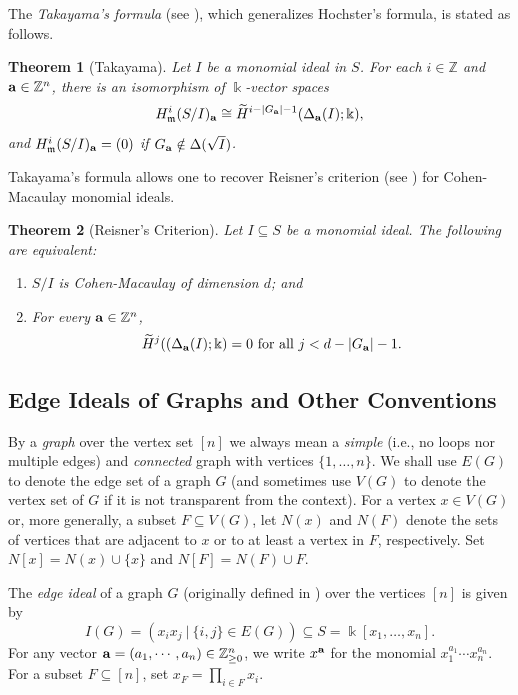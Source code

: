 \documentclass[12pt]{amsart}
\numberwithin{equation}{section}
\newtheorem{theorem}{Theorem}[section]
\theoremstyle{definition}
\theoremstyle{definition}
\newcommand{\ZZ}{{\mathbb Z}}
\def\kk{{\Bbbk}}
\def\a{{\bold a}}
\begin{document}
	The \textit{Takayama's formula} (see \cite{MT2011, T2005}), which generalizes Hochster's formula, is stated as follows. 
	
	\begin{theorem}[Takayama] \label{thm.Takayama}
		Let $I$ be a monomial ideal in $S$. For each $i\in\mathbb{Z}$ and $\a \in \mathbb{Z}^{n}$, there is an isomorphism of $\kk$-vector spaces 
		$$H_{\mathfrak{m}}^{i}(S/I)_{\a}\cong\widetilde{H}^{i-|G_{\a}|-1}(\Delta_{\a}(I);\kk),$$
		and $H_{\mathfrak{m}}^{i}(S/I)_{\a}=(0)$ if $G_{\a}\notin\Delta(\sqrt{I})$.
	\end{theorem} 
	
	Takayama's formula allows one to recover Reisner's criterion (see \cite{Reisner}) for Cohen-Macaulay monomial ideals.
	
	\begin{theorem}[Reisner's Criterion] \label{thm.Reisner}
		Let $I \subseteq S$ be a monomial ideal. The following are equivalent:
		\begin{enumerate}
			\item $S/I$ is Cohen-Macaulay of dimension $d$; and
			\item For every $\a \in \ZZ^n$,
			$$\widetilde{H}^j(\left(\Delta_\a(I);\kk\right) = 0 \text{ for all } j < d-|G_{\a}|-1.$$
		\end{enumerate}
	\end{theorem}
	
\subsection{Edge Ideals of Graphs and Other Conventions}

By a \emph{graph} over the vertex set $[n]$ we always mean a \emph{simple} (i.e., no loops nor multiple edges) and \emph{connected} graph with vertices $\{1, \dots, n\}$. We shall use $E(G)$ to denote the edge set of a graph $G$ (and sometimes use $V(G)$ to denote the vertex set of $G$ if it is not transparent from the context). For a vertex $x \in V(G)$ or, more generally, a subset $F \subseteq V(G)$, let $N(x)$ and $N(F)$ denote the sets of vertices that are adjacent to $x$ or to at least a vertex in $F$, respectively. Set $N[x] = N(x) \cup \{x\}$ and $N[F] = N(F) \cup F$.

The \emph{edge ideal} of a graph $G$ (originally defined in \cite{SVV1994}) over the vertices $[n]$ is given by
$$I(G) = \left(x_ix_j ~\big|~ \{i,j\} \in E(G)\right) \subseteq S = \kk[x_1, \dots, x_n].$$
For any vector $\a=(a_{1},\cdots,a_{n})\in\mathbb{Z}^{n}_{\ge 0}$, we write $x^\a$ for the monomial $x_1^{a_1} \cdots x_n^{a_n}$. For a subset $F \subseteq [n]$, set $x_F = \prod_{i \in F} x_i$. 
\end{document}
